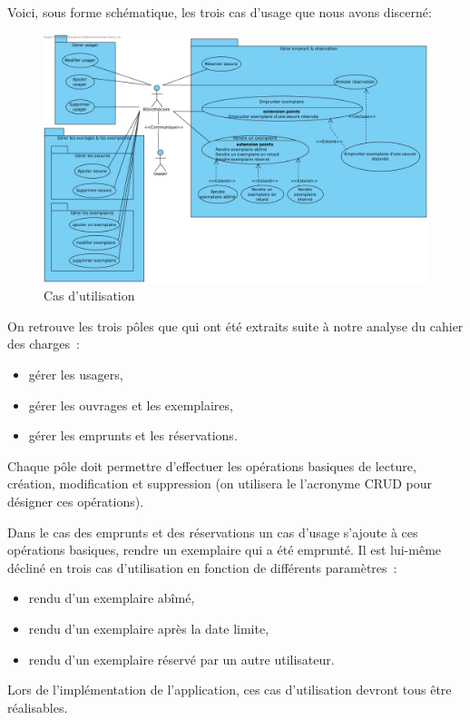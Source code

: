 \documentclass[a4paper,12pt]{article}
\begin{document}
Voici, sous forme schématique, les trois cas d’usage que nous avons discerné:

\begin{figure}[htb]
\centering
\includegraphics[width=.9\linewidth]{./res/img/cas-d-utilisation.png}
\caption{\label{fig:orgparagraph1}
Cas d'utilisation}
\end{figure}


On retrouve les trois pôles que qui ont été extraits suite à notre analyse du cahier des charges :
\begin{itemize}
\item gérer les usagers,
\item gérer les ouvrages et les exemplaires,
\item gérer les emprunts et les réservations.
\end{itemize}

Chaque pôle doit permettre d’effectuer les opérations basiques de lecture, création, modification et
suppression (on utilisera le l'acronyme CRUD pour désigner ces opérations).


Dans le cas des emprunts et des réservations un cas d’usage s’ajoute à ces
opérations basiques, rendre un exemplaire qui a été emprunté. Il est lui-même
décliné en trois cas d’utilisation en fonction de différents paramètres :
\begin{itemize}
\item rendu d’un exemplaire abîmé,
\item rendu d’un exemplaire après la date limite,
\item rendu d’un exemplaire réservé par un autre utilisateur.
\end{itemize}

Lors de l’implémentation de l’application, ces cas d’utilisation devront tous être réalisables.
\end{document}
